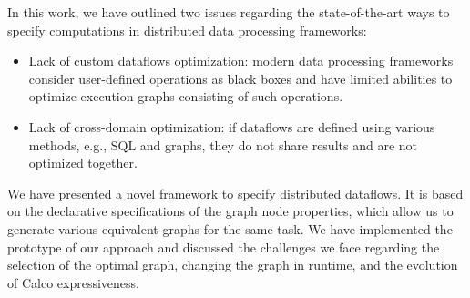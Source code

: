 In this work, we have outlined two issues regarding the state-of-the-art ways to specify computations in distributed data processing frameworks:
\begin{itemize}
    \item Lack of custom dataflows optimization: modern data processing frameworks consider user-defined operations as black boxes and have limited abilities to optimize execution graphs consisting of such operations.
    \item Lack of cross-domain optimization: if dataflows are defined using various methods, e.g., SQL and graphs, they do not share results and are not optimized together.
\end{itemize}

We have presented a novel framework to specify distributed dataflows.
It is based on the declarative specifications of the graph node properties, which allow us to generate various equivalent graphs for the same task.
We have implemented the prototype of our approach and discussed the challenges we face regarding the selection of the optimal graph, changing the graph in runtime, and the evolution of Calco expressiveness.